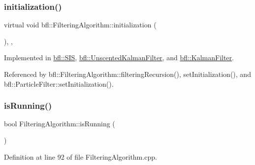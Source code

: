 \mbox{\label{classbfl_1_1FilteringAlgorithm_af2a072aa51407fe5544bdbb7ce466e2a}} 
\subsubsection{\texorpdfstring{initialization()}{initialization()}}
{\footnotesize\ttfamily virtual void bfl\+::\+Filtering\+Algorithm\+::initialization (\begin{DoxyParamCaption}{ }\end{DoxyParamCaption})\hspace{0.3cm}{\ttfamily [protected]}, {}, {\ttfamily [inherited]}}



Implemented in \mbox{\hyperlink{classbfl_1_1SIS_aaf9f4a14d51804eddcd93aa8a5ccbba8}{bfl\+::\+S\+IS}}, \mbox{\hyperlink{classbfl_1_1UnscentedKalmanFilter_acd5cfc6344d9ce24fb980aa22ecf4895}{bfl\+::\+Unscented\+Kalman\+Filter}}, and \mbox{\hyperlink{classbfl_1_1KalmanFilter_a34482fcfad20be0559cea9c060c5f949}{bfl\+::\+Kalman\+Filter}}.



Referenced by bfl\+::\+Filtering\+Algorithm\+::filtering\+Recursion(), set\+Initialization(), and bfl\+::\+Particle\+Filter\+::set\+Initialization().

\mbox{\label{classbfl_1_1FilteringAlgorithm_a5cfecab2c778620e2557237472bb1721}} 
\subsubsection{\texorpdfstring{is\+Running()}{isRunning()}}
{\footnotesize\ttfamily bool Filtering\+Algorithm\+::is\+Running (\begin{DoxyParamCaption}{ }\end{DoxyParamCaption})\hspace{0.3cm}{\ttfamily [inherited]}}



Definition at line 92 of file Filtering\+Algorithm.\+cpp.




